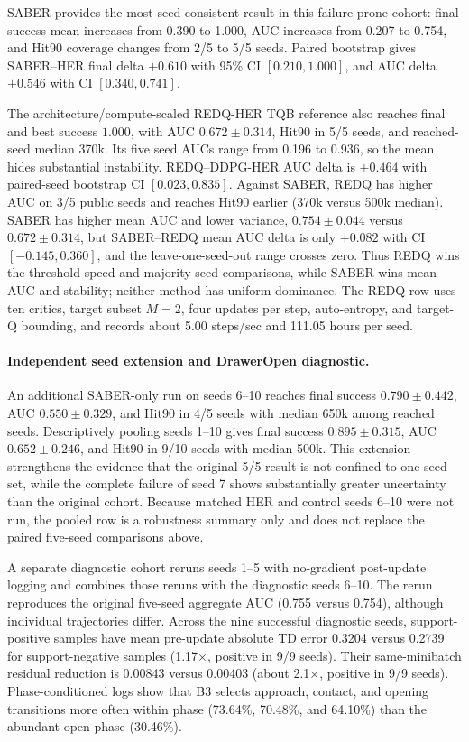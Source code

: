 \documentclass[letterpaper]{article}
\begin{document}
SABER provides the most seed-consistent result in this failure-prone cohort: final success mean increases from 0.390 to 1.000, AUC increases from 0.207 to 0.754, and Hit90 coverage changes from 2/5 to 5/5 seeds. Paired bootstrap gives SABER--HER final delta \(+0.610\) with 95\% CI \([0.210,1.000]\), and AUC delta \(+0.546\) with CI \([0.340,0.741]\).

The architecture/compute-scaled REDQ-HER TQB reference also reaches final and best success \(1.000\), with AUC \(0.672\pm0.314\), Hit90 in 5/5 seeds, and reached-seed median 370k. Its five seed AUCs range from 0.196 to 0.936, so the mean hides substantial instability. REDQ--DDPG-HER AUC delta is \(+0.464\) with paired-seed bootstrap CI \([0.023,0.835]\). Against SABER, REDQ has higher AUC on 3/5 public seeds and reaches Hit90 earlier (370k versus 500k median). SABER has higher mean AUC and lower variance, \(0.754\pm0.044\) versus \(0.672\pm0.314\), but SABER--REDQ mean AUC delta is only \(+0.082\) with CI \([-0.145,0.360]\), and the leave-one-seed-out range crosses zero. Thus REDQ wins the threshold-speed and majority-seed comparisons, while SABER wins mean AUC and stability; neither method has uniform dominance. The REDQ row uses ten critics, target subset \(M=2\), four updates per step, auto-entropy, and target-Q bounding, and records about 5.00 steps/sec and 111.05 hours per seed.

\paragraph{Independent seed extension and DrawerOpen diagnostic.}
An additional SABER-only run on seeds 6--10 reaches final success \(0.790\pm0.442\), AUC \(0.550\pm0.329\), and Hit90 in 4/5 seeds with median 650k among reached seeds. Descriptively pooling seeds 1--10 gives final success \(0.895\pm0.315\), AUC \(0.652\pm0.246\), and Hit90 in 9/10 seeds with median 500k. This extension strengthens the evidence that the original 5/5 result is not confined to one seed set, while the complete failure of seed 7 shows substantially greater uncertainty than the original cohort. Because matched HER and control seeds 6--10 were not run, the pooled row is a robustness summary only and does not replace the paired five-seed comparisons above.

A separate diagnostic cohort reruns seeds 1--5 with no-gradient post-update logging and combines those reruns with the diagnostic seeds 6--10. The rerun reproduces the original five-seed aggregate AUC (0.755 versus 0.754), although individual trajectories differ. Across the nine successful diagnostic seeds, support-positive samples have mean pre-update absolute TD error 0.3204 versus 0.2739 for support-negative samples (1.17\(\times\), positive in 9/9 seeds). Their same-minibatch residual reduction is 0.00843 versus 0.00403 (about 2.1\(\times\), positive in 9/9 seeds). Phase-conditioned logs show that B3 selects approach, contact, and opening transitions more often within phase (73.64\%, 70.48\%, and 64.10\%) than the abundant open phase (30.46\%).
\end{document}
